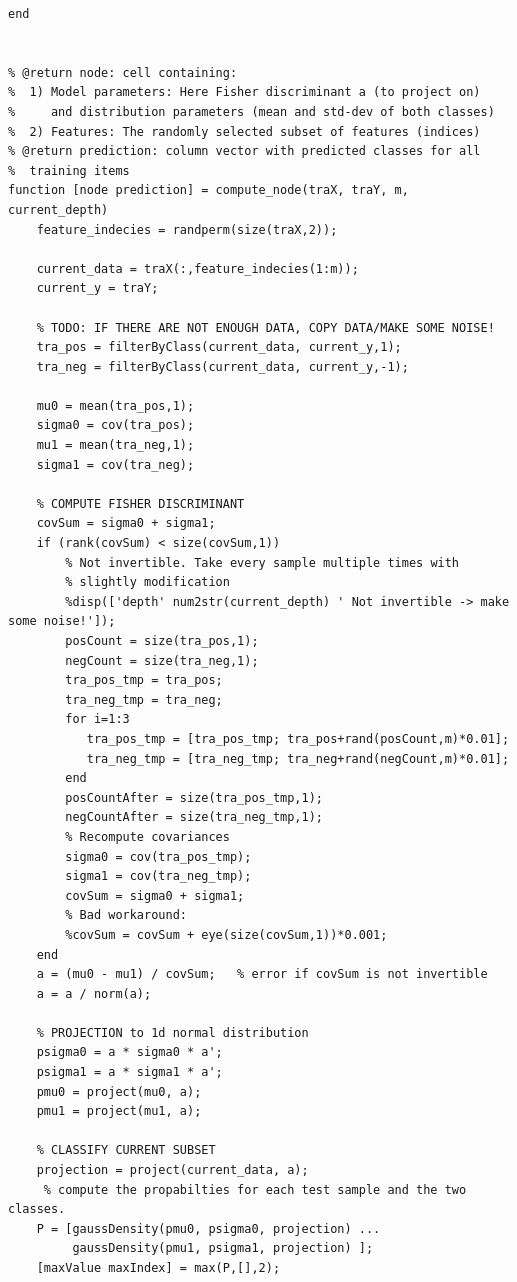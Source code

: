 \documentclass{article}
\begin{document}
\begin{lstlisting}
end


% @return node: cell containing:
%  1) Model parameters: Here Fisher discriminant a (to project on)
%     and distribution parameters (mean and std-dev of both classes)
%  2) Features: The randomly selected subset of features (indices)
% @return prediction: column vector with predicted classes for all
%  training items
function [node prediction] = compute_node(traX, traY, m, current_depth)
    feature_indecies = randperm(size(traX,2));

    current_data = traX(:,feature_indecies(1:m));
    current_y = traY;

    % TODO: IF THERE ARE NOT ENOUGH DATA, COPY DATA/MAKE SOME NOISE!
    tra_pos = filterByClass(current_data, current_y,1);
    tra_neg = filterByClass(current_data, current_y,-1);
    
    mu0 = mean(tra_pos,1);
    sigma0 = cov(tra_pos);
    mu1 = mean(tra_neg,1);
    sigma1 = cov(tra_neg);
    
    % COMPUTE FISHER DISCRIMINANT
    covSum = sigma0 + sigma1;
    if (rank(covSum) < size(covSum,1))
        % Not invertible. Take every sample multiple times with
        % slightly modification
        %disp(['depth' num2str(current_depth) ' Not invertible -> make some noise!']);
        posCount = size(tra_pos,1);
        negCount = size(tra_neg,1);
        tra_pos_tmp = tra_pos;
        tra_neg_tmp = tra_neg;
        for i=1:3
           tra_pos_tmp = [tra_pos_tmp; tra_pos+rand(posCount,m)*0.01];
           tra_neg_tmp = [tra_neg_tmp; tra_neg+rand(negCount,m)*0.01];
        end
        posCountAfter = size(tra_pos_tmp,1);
        negCountAfter = size(tra_neg_tmp,1);
        % Recompute covariances
        sigma0 = cov(tra_pos_tmp);
        sigma1 = cov(tra_neg_tmp);
        covSum = sigma0 + sigma1;
        % Bad workaround:
        %covSum = covSum + eye(size(covSum,1))*0.001;
    end
    a = (mu0 - mu1) / covSum;   % error if covSum is not invertible
    a = a / norm(a);

    % PROJECTION to 1d normal distribution
    psigma0 = a * sigma0 * a';
    psigma1 = a * sigma1 * a';    
    pmu0 = project(mu0, a);
    pmu1 = project(mu1, a);
  
    % CLASSIFY CURRENT SUBSET
    projection = project(current_data, a);
     % compute the propabilties for each test sample and the two classes.
    P = [gaussDensity(pmu0, psigma0, projection) ...
         gaussDensity(pmu1, psigma1, projection) ];
    [maxValue maxIndex] = max(P,[],2);
    

\end{lstlisting}
\end{document}
